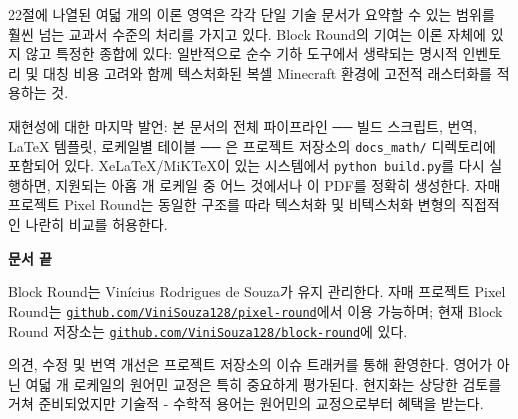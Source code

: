 \documentclass[12pt,a4paper]{scrartcl}
\newcommand{\code}[1]{\texttt{\small #1}}
\newcommand{\biblink}[2]{\href{#1}{\nolinkurl{#2}}}
\begin{document}
22절에 나열된 여덟 개의 이론 영역은 각각 단일 기술 문서가 요약할 수 있는 범위를 훨씬 넘는 교과서 수준의 처리를 가지고 있다. Block Round의 기여는 이론 자체에 있지 않고 특정한 종합에 있다: 일반적으로 순수 기하 도구에서 생략되는 명시적 인벤토리 및 대칭 비용 고려와 함께 텍스처화된 복셀 Minecraft 환경에 고전적 래스터화를 적용하는 것.

재현성에 대한 마지막 발언: 본 문서의 전체 파이프라인 ── 빌드 스크립트, 번역, LaTeX 템플릿, 로케일별 테이블 ── 은 프로젝트 저장소의 \code{docs\_math/} 디렉토리에 포함되어 있다. XeLaTeX/MiKTeX이 있는 시스템에서 \code{python build.py}를 다시 실행하면, 지원되는 아홉 개 로케일 중 어느 것에서나 이 PDF를 정확히 생성한다. 자매 프로젝트 Pixel Round는 동일한 구조를 따라 텍스처화 및 비텍스처화 변형의 직접적인 나란히 비교를 허용한다.

\vspace{1.2em}

\begin{center}
{\sffamily\bfseries\color{accent}문서 끝}
\end{center}

\vspace{0.6em}

Block Round는 Vinícius Rodrigues de Souza가 유지 관리한다. 자매 프로젝트 Pixel Round는 \biblink{https://github.com/ViniSouza128/pixel-round}{github.com/ViniSouza128/pixel-round}에서 이용 가능하며; 현재 Block Round 저장소는 \biblink{https://github.com/ViniSouza128/block-round}{github.com/ViniSouza128/block-round}에 있다.

의견, 수정 및 번역 개선은 프로젝트 저장소의 이슈 트래커를 통해 환영한다. 영어가 아닌 여덟 개 로케일의 원어민 교정은 특히 중요하게 평가된다. 현지화는 상당한 검토를 거쳐 준비되었지만 기술적 - 수학적 용어는 원어민의 교정으로부터 혜택을 받는다.
\end{document}
